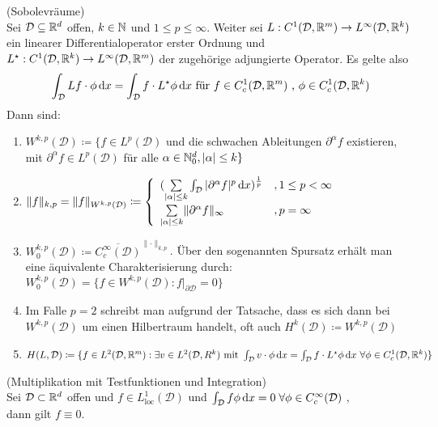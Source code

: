 \begin{Definition}(Sobolevräume)\\
	Sei $\mathcal{D} \subseteq \mathbb{R}^d $ offen, $ k \in \mathbb{N} $ und $ 1 \leq p \leq \infty $.  Weiter sei $ L : C^1(\mathcal{D},\mathbb{R}^m) \to L^{\infty}(\mathcal{D},\mathbb{R}^k) $ ein linearer Differentialoperator erster Ordnung und $ L^{\star} : C^1(\mathcal{D},\mathbb{R}^k) \to L^{\infty}(\mathcal{D},\mathbb{R}^m) $ der zugehörige adjungierte Operator. Es gelte also
	\[
	\int_{\mathcal{D}} Lf \cdot \phi \, \mathrm{d} x = \int_{\mathcal{D}} f \cdot L^{\star} \phi \, \mathrm{d} x \text{ für } f \in C^1_c(\mathcal{D},\mathbb{R}^m) \text{ , } \phi \in C^1_c (\mathcal{D},\mathbb{R}^k)
	\]
	Dann sind:
	\begin{enumerate}[label=(\alph*)]
		\item $ W^{k,p} (\mathcal{D}) \coloneqq \{ f \in L^p(\mathcal{D})$ und die schwachen Ableitungen $ \partial^{\alpha}f $ existieren, mit $ \partial^{\alpha}f \in L^p(\mathcal{D}) $ für alle $ \alpha \in \mathbb{N}_0^d , |\alpha| \leq k \} $	
		\item $ \lVert f \rVert_{k,p} =  \lVert f \rVert_{W^{k,p}(\mathcal{D})} \coloneqq 
				\begin{cases}
					\begin{array}{lll}
						(\sum\limits_{|\alpha|\leq k} \int_{\mathcal{D}} |\partial^{\alpha} f |^p \, \mathrm{d} x)^{\frac{1}{p}} &, 1 \leq p < \infty \\
						\sum\limits_{|\alpha|\leq k}   \lVert \partial^{\alpha} f \rVert_{\infty}        &, p = \infty
					\end{array}
				\end{cases}  $
		\item $ W_0^{k,p}(\mathcal{D}) \coloneqq \overline{ C_c^{\infty}(\mathcal{D}) }^{\lVert \cdot \rVert_{k,p}} $. Über den sogenannten Spursatz erhält man eine äquivalente Charakterisierung durch: 
		$ W_0^{k,p}(\mathcal{D}) = \{ f \in W^{k,p}(\mathcal{D}) : f|_{\partial \mathcal{D}} = 0 \}$
		\item Im Falle $ p = 2 $ schreibt man aufgrund der Tatsache, dass es sich dann bei $ W^{k,p}(\mathcal{D}) $ um einen Hilbertraum handelt, oft auch $ H^k(\mathcal{D}) \coloneqq W^{k,p}(\mathcal{D}) $
		\item $ H(L,\mathcal{D}) \coloneqq \{ f \in L^2(\mathcal{D},\mathbb{R}^m) : \exists v \in L^2(\mathcal{D},R^k) \text{ mit } \int_{\mathcal{D}} v \cdot \phi \, \mathrm{d} x = \int_{\mathcal{D}} f \cdot L^{\star}\phi \, \mathrm{d} x \ \forall \phi \in C^1_c(\mathcal{D},\mathbb{R}^k) \}$
	\end{enumerate}
\end{Definition}

\begin{Satz}(Multiplikation mit Testfunktionen und Integration) \\ 
	\label{testfunktionen}
	Sei $\mathcal{D} \subset \mathbb{R}^d$ offen und $f \in L_{\text{loc}}^1(\mathcal{D})$ und $\int_{\mathcal{D}} f \phi \, \mathrm{d} x = 0 \; \forall \phi \in C_c^{\infty}(\mathcal{D})$ ,\\
	dann gilt $ f \equiv 0 $.
\end{Satz}
